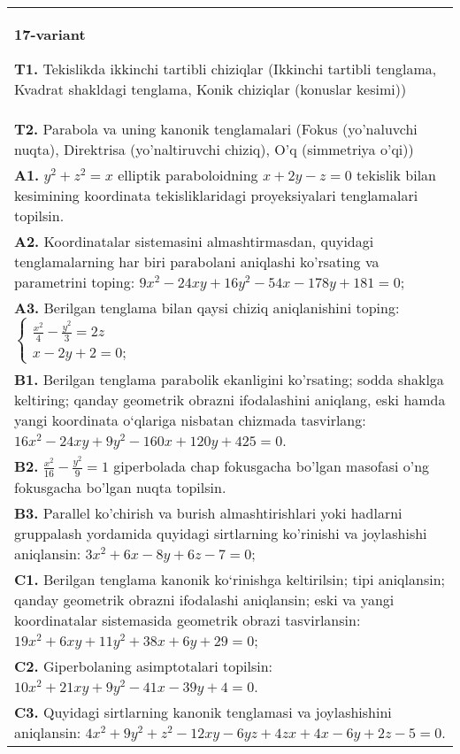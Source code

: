 \documentclass{article}
\begin{document}
\begin{tabular}{m{17cm}}
\textbf{17-variant}
\newline

\textbf{T1.} Tekislikda ikkinchi tartibli chiziqlar (Ikkinchi tartibli tenglama, Kvadrat shakldagi tenglama, Konik chiziqlar (konuslar kesimi)) \\
\textbf{T2.} Parabola va uning kanonik tenglamalari (Fokus (yo’naluvchi nuqta), Direktrisa (yo’naltiruvchi chiziq), O’q (simmetriya o’qi)) \\
\textbf{A1.} $y^2+z^2=x$ elliptik paraboloidning $x+2 y-z=0$ tekislik bilan kesimining koordinata tekisliklaridagi proyeksiyalari tenglamalari topilsin. \\
\textbf{A2.} Koordinatalar sistemasini almashtirmasdan, quyidagi tenglamalarning har biri parabolani aniqlashi ko'rsating va parametrini toping: $9 x^2-24 x y+16 y^2-54 x-178 y+181=0$; \\
\textbf{A3.} Berilgan tenglama bilan qaysi chiziq aniqlanishini toping: $\left\{\begin{array}{l}\frac{x^2}{4}-\frac{y^2}{3}=2 z \\ x-2 y+2=0 ;\end{array}\right.$ \\
\textbf{B1.} Berilgan tenglama parabolik ekanligini ko'rsating; sodda shaklga keltiring; qanday geometrik obrazni ifodalashini aniqlang, eski hamda yangi koordinata o‘qlariga nisbatan chizmada tasvirlang: $16 x^2-24 x y+9 y^2-160 x+120 y+425=0$. \\
\textbf{B2.} $\frac{x^2}{16}-\frac{y^2}{9}=1$ giperbolada chap fokusgacha bo'lgan masofasi o'ng fokusgacha bo'lgan nuqta topilsin. \\
\textbf{B3.} Parallel ko'chirish va burish almashtirishlari yoki hadlarni gruppalash yordamida quyidagi sirtlarning ko'rinishi va joylashishi aniqlansin: $3 x^2+6 x-8 y+6 z-7=0$; \\
\textbf{C1.} Berilgan tenglama kanonik ko‘rinishga keltirilsin; tipi aniqlansin; qanday geometrik obrazni ifodalashi aniqlansin; eski va yangi koordinatalar sistemasida geometrik obrazi tasvirlansin: $19 x^2+6 x y+11 y^2+38 x+6 y+29=0$; \\
\textbf{C2.} Giperbolaning asimptotalari topilsin: $10 x^2+21 x y+9 y^2-41 x-39 y+4=0$. \\
\textbf{C3.} Quyidagi sirtlarning kanonik tenglamasi va joylashishini aniqlansin: $4 x^2+9 y^2+z^2-12 x y-6 y z+4 z x+4 x-6 y+2 z-5=0$. \\

\end{tabular}
\vspace{1cm}
\end{document}
